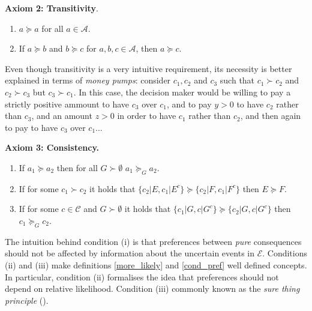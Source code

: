 \documentclass[english,letterpaper,12pt,final]{article}
\theoremstyle{definition}
\begin{document}
	\textbf{Axiom 2: Transitivity}.
	\begin{enumerate}[label=(\roman*)]
	\item $a \succeq a$ for all $a \in \mathcal{A}$.
	\item If $a \succeq b$ and $b \succeq c$ for $a,b,c \in \mathcal{A}$, then $a \succeq c$.
	\end{enumerate}
	Even though transitivity is a very intuitive requirement, its necessity is better explained in terms of \textit{money pumps}: consider $c_1, c_2$ and $c_3$ such that $c_1 \succ c_2$ and $c_2 \succ c_3$ but $c_3 \succ c_1$. In this case, the decision maker would be willing to pay a strictly positive ammount to have $c_3$ over $c_1$, and to pay $y>0$ to have $c_2$ rather than $c_3$, and an amount $z>0$ in order to have $c_1$ rather than $c_2$, and then again to pay to have $c_3$ over $c_1$...
	
	\textbf{Axiom 3: Consistency.}
	\begin{enumerate}[label=(\roman*)]
	\item If $a_1 \succeq a_2$ then for all $G \succ \emptyset$ $a_1 \succeq_G a_2$.
	\item If for some $c_1 \succ c_2$ it holds that $\{ c_2 | E, c_1 | E^c \} \succeq \{ c_2 | F, c_1 | F^c \}$ then $E \succeq F$.
	\item If for some $c \in \mathcal{C}$ and $G \succ \emptyset$ it holds that $\{ c_1 | G, c | G^c \} \succeq \{c_2 | G, c | G^c  \}$ then $c_1 \succeq_G c_2$.
 	\end{enumerate}
    The intuition behind condition (i) is that preferences between \textit{pure} consequences should not be affected by information about the uncertain events in $\mathcal{E}$. Conditions (ii) and (iii) make definitions \ref{more_likely} and \ref{cond_pref} well defined concepts. In particular, condition (ii) formalises the idea that preferences should not depend on relative likelihood. Condition (iii) commonly known as the \textit{sure thing principle} (\cite{bernardo2000bayesian}).
	
\end{document}
